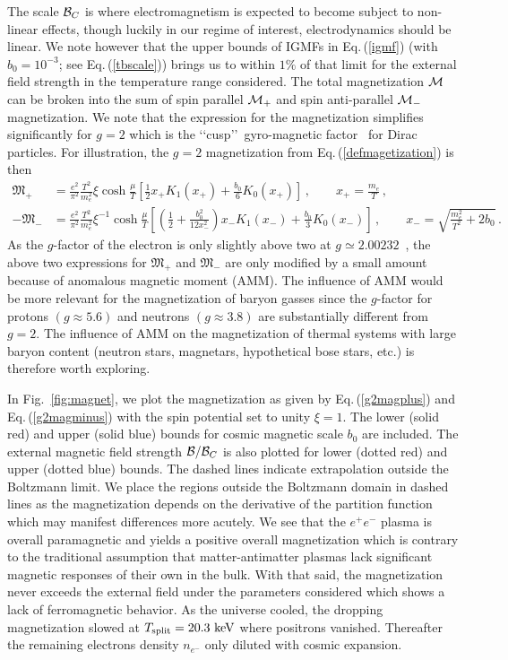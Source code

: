 \documentclass[a4paper]{article}
\newcommand*{\keV}{\text{ keV}}
\newcommand{\req}[1]{Eq.\,(\ref{#1})}
\newcommand{\rf}[1]{Fig.~{\ref{#1}}}
\begin{document}
The scale ${\cal B}_{C}$ is where electromagnetism is expected to become subject to non-linear effects, though luckily in our regime of interest, electrodynamics should be linear. We note however that the upper bounds of IGMFs in \req{igmf} (with $b_{0}=10^{-3}$; see \req{tbscale}) brings us to within $1\%$ of that limit for the external field strength in the temperature range considered. The total magnetization ${\cal M}$ can be broken into the sum of spin parallel ${\cal M}_{+}$ and spin anti-parallel ${\cal M}_{-}$ magnetization. We note that the expression for the magnetization simplifies significantly for $g=2$ which is the \lq\lq cusp\rq\rq\ gyro-magnetic factor~\cite{rafelski2022study} for Dirac particles. For illustration, the $g=2$ magnetization from \req{defmagetization} is then
\begin{align}
    \label{g2magplus}
    {\mathfrak M}_{+}&=\frac{e^{2}}{\pi^{2}}\frac{T^{2}}{m_{e}^{2}}\xi\cosh{\frac{\mu}{T}}\left[\frac{1}{2}x_{+}K_{1}(x_{+})+\frac{b_{0}}{6}K_{0}(x_{+})\right]\,,\qquad x_{+}=\frac{m_{e}}{T}\,,\\
    \label{g2magminus}
    -{\mathfrak M}_{-}&=\frac{e^{2}}{\pi^{2}}\frac{T^{2}}{m_{e}^{2}}\xi^{-1}\cosh{\frac{\mu}{T}}\left[\left(\frac{1}{2}+\frac{b_{0}^{2}}{12x_{-}^{2}}\right)x_{-}K_{1}(x_{-})+\frac{b_{0}}{3}K_{0}(x_{-})\right]\,,\qquad x_{-}=\sqrt{\frac{m_{e}^{2}}{T^{2}}+2b_{0}}\,.
\end{align}
As the $g$-factor of the electron is only slightly above two at $g\simeq2.00232$~\cite{tiesinga2021codata}, the above two expressions for ${\mathfrak M}_{+}$ and ${\mathfrak M}_{-}$ are only modified by a small amount because of anomalous magnetic moment (AMM). The influence of AMM would be more relevant for the magnetization of baryon gasses since the $g$-factor for protons $(g\approx5.6)$ and neutrons $(g\approx3.8)$ are substantially different from $g=2$. The influence of AMM on the magnetization of thermal systems with large baryon content (neutron stars, magnetars, hypothetical bose stars, etc.) is therefore worth exploring.

In \rf{fig:magnet}, we plot the magnetization as given by \req{g2magplus} and \req{g2magminus} with the spin potential set to unity $\xi=1$. The lower (solid red) and upper (solid blue) bounds for cosmic magnetic scale $b_{0}$ are included. The external magnetic field strength ${\cal B}/{\cal B}_{C}$ is also plotted for lower (dotted red) and upper (dotted blue) bounds. The dashed lines indicate extrapolation outside the Boltzmann limit. We place the regions outside the Boltzmann domain in dashed lines as the magnetization depends on the derivative of the partition function which may manifest differences more acutely. We see that the $e^{+}e^{-}$ plasma is overall paramagnetic and yields a positive overall magnetization which is contrary to the traditional assumption that matter-antimatter plasmas lack significant magnetic responses of their own in the bulk. With that said, the magnetization never exceeds the external field under the parameters considered which shows a lack of ferromagnetic behavior. As the universe cooled, the dropping magnetization slowed at $T_{\rm split}=20.3\keV$ where positrons vanished. Thereafter the remaining electrons density $n_{e^{-}}$ only diluted with cosmic expansion.
\end{document}
